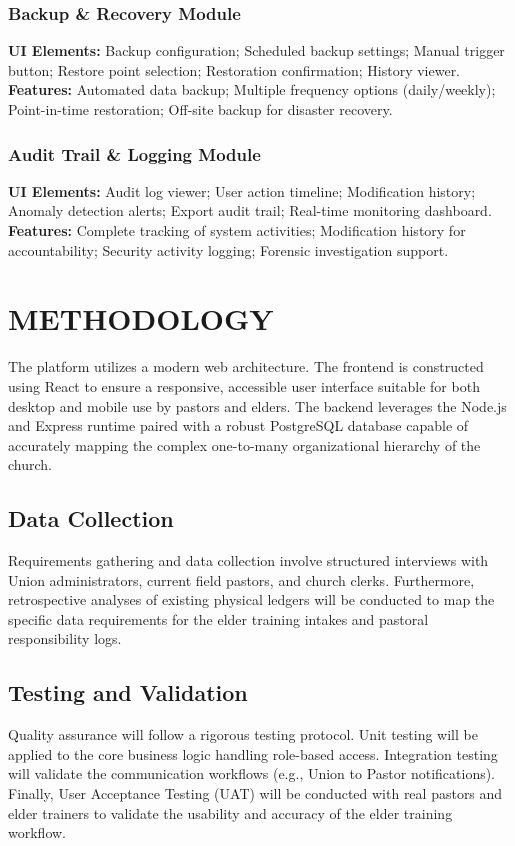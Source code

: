 \documentclass[12pt]{report}
\begin{document}
\subsection{Backup \& Recovery Module}
\textbf{UI Elements:} Backup configuration; Scheduled backup settings; Manual trigger button; Restore point selection; Restoration confirmation; History viewer. \\
\textbf{Features:} Automated data backup; Multiple frequency options (daily/weekly); Point-in-time restoration; Off-site backup for disaster recovery.

\subsection{Audit Trail \& Logging Module}
\textbf{UI Elements:} Audit log viewer; User action timeline; Modification history; Anomaly detection alerts; Export audit trail; Real-time monitoring dashboard. \\
\textbf{Features:} Complete tracking of system activities; Modification history for accountability; Security activity logging; Forensic investigation support.

\chapter{METHODOLOGY}
The platform utilizes a modern web architecture. The frontend is constructed using React to ensure a responsive, accessible user interface suitable for both desktop and mobile use by pastors and elders. The backend leverages the Node.js and Express runtime paired with a robust PostgreSQL database capable of accurately mapping the complex one-to-many organizational hierarchy of the church.

\section{Data Collection}
Requirements gathering and data collection involve structured interviews with Union administrators, current field pastors, and church clerks. Furthermore, retrospective analyses of existing physical ledgers will be conducted to map the specific data requirements for the elder training intakes and pastoral responsibility logs.

\section{Testing and Validation}
Quality assurance will follow a rigorous testing protocol. Unit testing will be applied to the core business logic handling role-based access. Integration testing will validate the communication workflows (e.g., Union to Pastor notifications). Finally, User Acceptance Testing (UAT) will be conducted with real pastors and elder trainers to validate the usability and accuracy of the elder training workflow.
\end{document}
